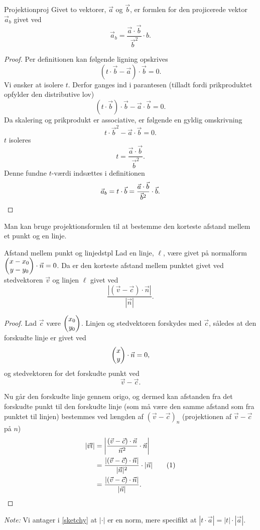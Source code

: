 \documentclass{article}
\begin{document}
\begin{theorem}{Projektion}{proj}
    Givet to vektorer, $\vec{a}$ og $\vec{b}$, er formlen for den projicerede
    vektor $\vec{a}_b$ givet ved 
    \[
        \vec{a}_b = \frac{\vec{a} \cdot \vec{b}}{\vec{b}^2} \cdot b.
    \] 
\end{theorem}

\begin{proof}
Per definitionen kan følgende ligning opskrives
\[
    (t \cdot \vec{b} - \vec{a}) \cdot \vec{b} = 0.
\] 
Vi ønsker at isolere $t$. Derfor ganges ind i parantesen (tilladt fordi
prikproduktet opfylder den distributive lov)
\[
    (t \cdot \vec{b}) \cdot \vec{b} - \vec{a} \cdot \vec{b} = 0.
\] 
Da skalering og prikprodukt er associative, er følgende en gyldig omskrivning
\[
    t \cdot \vec{b}^2 - \vec{a} \cdot \vec{b} = 0.
\] 
$t$ isoleres
\[
    t = \frac{\vec{a} \cdot \vec{b}}{\vec{b}^2}.
\] 
Denne fundne $t$-værdi indsættes i definitionen
\[
    \vec{a}_b = t \cdot \vec{b} = \frac{\vec{a} \cdot \vec{b}}{\vec{b}^2} \cdot \vec{b}.\qedhere
\] 
\end{proof}

Man kan bruge projektionsformlen til at bestemme den korteste afstand mellem et
punkt og en linje.

\smallskip

\begin{theorem}{Afstand mellem punkt og linje}{dstpl}
    Lad en linje, $\ell$, være givet på normalform $ \begin{pmatrix} x - x_0\\ y - y_0 \end{pmatrix} 
    \cdot \vec{n} = 0$. Da er den korteste afstand mellem punktet givet ved
    stedvektoren $\vec{v}$ og linjen $\ell$ givet ved
    \[
        \frac{|(\vec{v} - \vec{c}) \cdot \vec{n}|}{|\vec{n}|}.
    \] 
\end{theorem}

\begin{proof}
    Lad $\vec{c}$ være $ \begin{pmatrix} x_0\\ y_0 \end{pmatrix} $. Linjen og stedvektoren forskydes
    med $\vec{c}$, således at den forskudte linje er givet ved
    \[
         \begin{pmatrix} x\\ y \end{pmatrix}  \cdot \vec{n} = 0,
    \] 
    og stedvektoren for det forskudte punkt ved
    \[
        \vec{v} - \vec{c}.
    \] 

    Nu går den forskudte linje gennem origo, og dermed kan afstanden fra det
    forskudte punkt til den forskudte linje (som må være den samme afstand som
    fra punktet til linjen) bestemmes ved længden af $(\vec{v} -
    \vec{c})_{n}$ (projektionen af $\vec{v} - \vec{c}$ på $n$)
    \begin{align*}
        |\vec{v}l| &= \left| \frac{(\vec{v} - \vec{c}) \cdot \vec{n}}{\vec{n}^2} \cdot \vec{n} \right|\\
                   &= \frac{|(\vec{v} - \vec{c}) \cdot \vec{n}|}{|\vec{n}|^2} \cdot |\vec{n}|\tag{1}\label{sketchy}\\
                   &= \frac{|(\vec{v} - \vec{c}) \cdot \vec{n}|}{|\vec{n}|}.\qedhere
    \end{align*}
\end{proof}
\emph{Note:} Vi antager i \eqref{sketchy} at $|\cdot|$ er en norm, mere specifikt at $|t \cdot \vec{a}| = |t| \cdot |\vec{a}|$.
\end{document}
